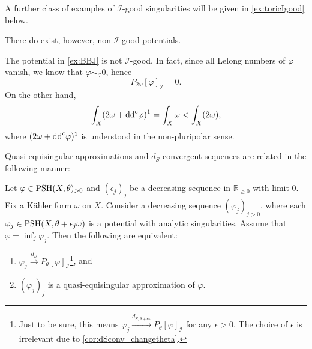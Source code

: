 A further class of examples of $\mathcal{I}$-good singularities will be given in \cref{ex:toricIgood} below.

There do exist, however, non-$\mathcal{I}$-good potentials.
\begin{example}\label{ex:Igood:L228}
    The potential in \cref{ex:BBJ} is not $\mathcal{I}$-good. In fact, since all Lelong numbers of $\varphi$ vanish, we know that $\varphi\sim_{\mathcal{I}}0$, hence
    \[
    P_{2\omega}[\varphi]_{\mathcal{I}}=0.
    \]
    On the other hand,
    \[
    \int_X (2\omega+\mathrm{dd}^{\mathrm{c}} \varphi)^1=\int_X \omega<\int_X (2\omega),
    \]
    where $(2\omega+\mathrm{dd}^{\mathrm{c}} \varphi)^1$ is understood in the non-pluripolar sense.
\end{example}

Quasi-equisingular approximations and $d_S$-convergent sequences are related in the following manner:
\begin{corollary}\label{cor:quasi-equichar}
    Let $\varphi\in \mathrm{PSH}(X,\theta)_{>0}$ and $(\epsilon_j)_j$ be a decreasing sequence in $\mathbb{R}_{\geq 0}$ with limit $0$. Fix a Kähler form $\omega$ on $X$.
    Consider a decreasing sequence $(\varphi_j)_{j>0}$, where each $\varphi_j\in \mathrm{PSH}(X,\theta+\epsilon_j\omega)$ is a potential with analytic singularities. Assume that $\varphi=\inf_j \varphi_j$. Then the following are equivalent:
    \begin{enumerate}
        \item\label{itm:cor:quasi-equichar:1} $\varphi_j\xrightarrow{d_S}P_{\theta}[\varphi]_{\mathcal{I}}$\footnote{Just to be sure, this means $\varphi_j\xrightarrow{d_{S,\theta+\epsilon \omega}}P_{\theta}[\varphi]_{\mathcal{I}}$ for any $\epsilon>0$. The choice of $\epsilon$ is irrelevant due to \cref{cor:dSconv_changetheta}.}, and
        \item\label{itm:cor:quasi-equichar:2} $(\varphi_j)_j$ is a quasi-equisingular approximation of $\varphi$.
    \end{enumerate}
\end{corollary}
